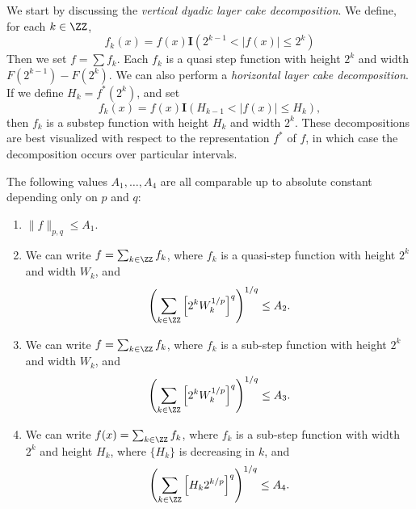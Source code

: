 We start by discussing the \emph{vertical dyadic layer cake decomposition}. We define, for each $k \in \ZZ$,
%
\[ f_k(x) = f(x) \mathbf{I}(2^{k-1} < |f(x)| \leq 2^k) \]
%
Then we set $f = \sum f_k$. Each $f_k$ is a quasi step function with height $2^k$ and width $F(2^{k-1}) - F(2^k)$. We can also perform a \emph{horizontal layer cake decomposition}. If we define $H_k = f^*(2^k)$, and set
%
\[ f_k(x) = f(x) \mathbf{I}(H_{k-1} < |f(x)| \leq H_k), \]
%
then $f_k$ is a substep function with height $H_k$ and width $2^k$. These decompositions are best visualized with respect to the representation $f^*$ of $f$, in which case the decomposition occurs over particular intervals.

\begin{theorem}
    The following values $A_1, \dots, A_4$ are all comparable up to absolute constant depending only on $p$ and $q$:
    \begin{enumerate}
        \item \label{onebound} $\| f \|_{p,q} \leq A_1$.

        \item \label{twobound} We can write $f = \sum_{k \in \ZZ} f_k$, where $f_k$ is a quasi-step function with height $2^k$ and width $W_k$, and
        \[ \left( \sum_{k \in \ZZ} \left[ 2^k W_k^{1/p} \right]^q \right)^{1/q} \leq A_2. \]

        \item \label{threebound} We can write $f = \sum_{k \in \ZZ} f_k$, where $f_k$ is a sub-step function with height $2^k$ and width $W_k$, and
        \[ \left( \sum_{k \in \ZZ} \left[2^{k} W_k^{1/p} \right]^q \right)^{1/q} \leq A_3. \]

        \item \label{fourbound} We can write $f(x) = \sum_{k \in \ZZ} f_k$, where $f_k$ is a sub-step function with width $2^k$ and height $H_k$, where $\{ H_k \}$ is decreasing in $k$, and
        \[ \left( \sum_{k \in \ZZ} \left[H_k 2^{k/p} \right]^q \right)^{1/q} \leq A_4. \]
    \end{enumerate}
\end{theorem}
